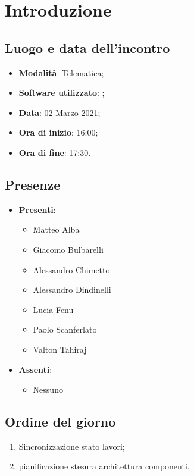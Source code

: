 \documentclass[]{article}
\begin{document}
	

	\newpage


		\section{Introduzione}
		\subsection{Luogo e data dell'incontro}
		\begin{itemize}
			\item \textbf{Modalità}: Telematica;
			\item \textbf{Software utilizzato}: ;
			\item \textbf{Data}: 02 Marzo 2021;
			\item \textbf{Ora di inizio}: 16:00;
			\item \textbf{Ora di fine}: 17:30.
		\end{itemize}

		\subsection{Presenze}
		\begin{itemize}
			\item \textbf{Presenti}:
			\begin{itemize}
				\item Matteo Alba
				\item Giacomo Bulbarelli
				\item Alessandro Chimetto
				\item Alessandro Dindinelli
				\item Lucia Fenu
				\item Paolo Scanferlato
				\item Valton Tahiraj
			\end{itemize}
			\item \textbf{Assenti}:
			\begin{itemize}
				\item Nessuno
			\end{itemize}
		\end{itemize}


		\subsection{Ordine del giorno}
		\begin{enumerate}
			\item Sincronizzazione stato lavori;
			\item pianificazione stesura architettura componenti.
		\end{enumerate}
\end{document}
